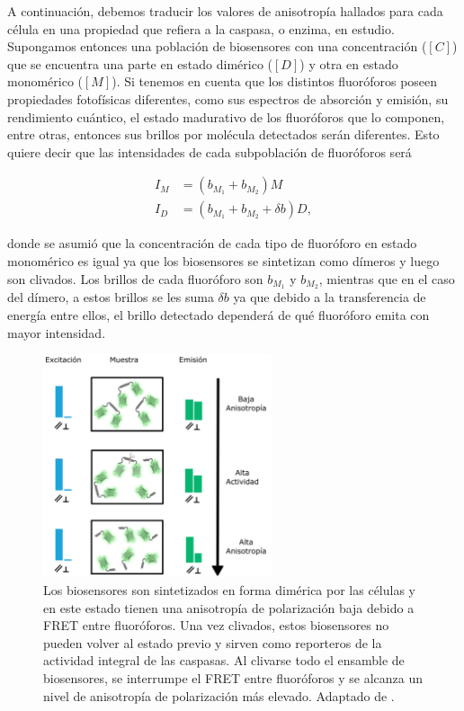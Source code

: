 A continuación, debemos traducir los valores de anisotropía hallados para cada célula en una propiedad que refiera a la caspasa, o enzima, en estudio. Supongamos entonces una población de biosensores con una concentración ($[C]$) que se encuentra una parte en estado dimérico ($[D]$) y otra en estado monomérico ($[M]$). Si tenemos en cuenta que los distintos fluoróforos poseen propiedades fotofísicas diferentes, como sus espectros de absorción y emisión, su rendimiento cuántico, el estado madurativo de los fluoróforos que lo componen, entre otras, entonces sus brillos por molécula detectados serán diferentes. Esto quiere decir que las intensidades de cada subpoblación de fluoróforos será

\begin{align}
    I_M &= (b_{M_1} + b_{M_2}) M\\
    I_D &= (b_{M_1} + b_{M_2} + \delta b) D,
\end{align}

\noindent donde se asumió que la concentración de cada tipo de fluoróforo en estado monomérico es igual ya que los biosensores se sintetizan como dímeros y luego son clivados. Los brillos de cada fluoróforo son $b_{M_1}$ y $b_{M_2}$, mientras que en el caso del dímero, a estos brillos se les suma $\delta b$ ya que debido a la transferencia de energía entre ellos, el brillo detectado dependerá de qué fluoróforo emita con mayor intensidad.

\begin{figure}[htb]
    \centering
    \includegraphics[width=0.6\textwidth]{img/cap_2/anisotropy_sensors.png}
    \caption{\footnotesize{Los biosensores son sintetizados en forma dimérica por las células y en este estado tienen una anisotropía de polarización baja debido a FRET entre fluoróforos. Una vez clivados, estos biosensores no pueden volver al estado previo y sirven como reporteros de la actividad integral de las caspasas. Al clivarse todo el ensamble de biosensores, se interrumpe el FRET entre fluoróforos y se alcanza un nivel de anisotropía de polarización más elevado. Adaptado de \cite{Corbat2018}.}}
    \label{fig:anisotropia_biosensor}
\end{figure}

